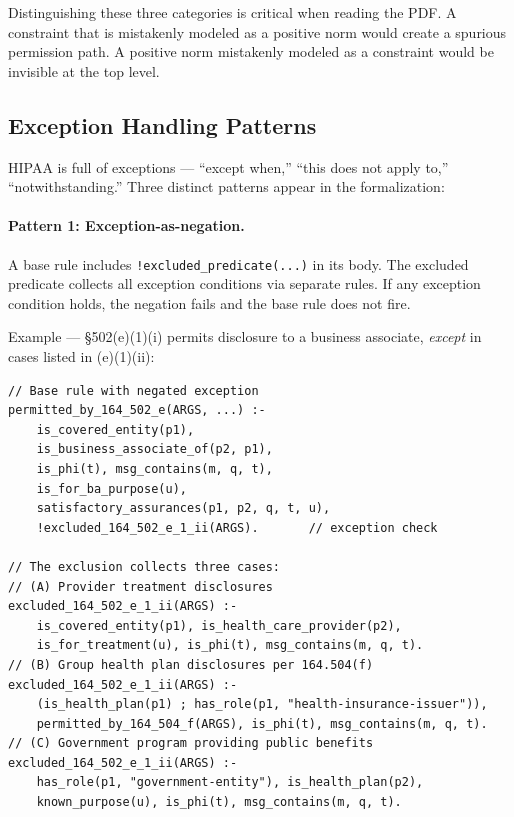 \documentclass[11pt,letterpaper]{article}
\begin{document}
\begin{designbox}
Distinguishing these three categories is critical when reading the PDF. A constraint that is mistakenly modeled as a positive norm would create a spurious permission path. A positive norm mistakenly modeled as a constraint would be invisible at the top level.
\end{designbox}

\subsection{Exception Handling Patterns}
\label{sec:exception-patterns}

HIPAA is full of exceptions --- ``except when,'' ``this does not apply to,'' ``notwithstanding.'' Three distinct patterns appear in the formalization:

\paragraph{Pattern 1: Exception-as-negation.} A base rule includes \texttt{!excluded\_predicate(...)} in its body. The excluded predicate collects all exception conditions via separate rules. If any exception condition holds, the negation fails and the base rule does not fire.

Example --- \S 502(e)(1)(i) permits disclosure to a business associate, \emph{except} in cases listed in (e)(1)(ii):

\begin{lstlisting}[style=soufflestyle,caption={Exception-as-negation pattern (from hipaa\_164\_502.dl)}]
// Base rule with negated exception
permitted_by_164_502_e(ARGS, ...) :-
    is_covered_entity(p1),
    is_business_associate_of(p2, p1),
    is_phi(t), msg_contains(m, q, t),
    is_for_ba_purpose(u),
    satisfactory_assurances(p1, p2, q, t, u),
    !excluded_164_502_e_1_ii(ARGS).       // exception check

// The exclusion collects three cases:
// (A) Provider treatment disclosures
excluded_164_502_e_1_ii(ARGS) :-
    is_covered_entity(p1), is_health_care_provider(p2),
    is_for_treatment(u), is_phi(t), msg_contains(m, q, t).
// (B) Group health plan disclosures per 164.504(f)
excluded_164_502_e_1_ii(ARGS) :-
    (is_health_plan(p1) ; has_role(p1, "health-insurance-issuer")),
    permitted_by_164_504_f(ARGS), is_phi(t), msg_contains(m, q, t).
// (C) Government program providing public benefits
excluded_164_502_e_1_ii(ARGS) :-
    has_role(p1, "government-entity"), is_health_plan(p2),
    known_purpose(u), is_phi(t), msg_contains(m, q, t).
\end{lstlisting}
\end{document}
